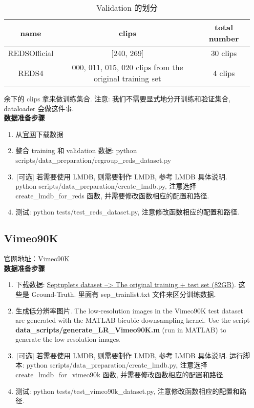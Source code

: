 \documentclass[../main.tex]{subfiles}
\begin{document}
\begin{table}[htbp]
    \centering
    \begin{tabular}{|c|c|c|}
        \hline
        \textbf{name} & \textbf{clips}                                          & \textbf{total number} \\ \hline
        REDSOfficial  & [240, 269]                                              & 30 clips              \\ \hline
        REDS4         & 000, 011, 015, 020 clips from the original training set & 4 clips               \\ \hline
    \end{tabular}
    \caption{Validation 的划分}
\end{table}
余下的 clips 拿来做训练集合. 注意: 我们不需要显式地分开训练和验证集合, dataloader 会做这件事.\\

\noindent\textbf{数据准备步骤}

\begin{enumerate}
    \item 从\href{https://seungjunnah.github.io/Datasets/reds.html}{官网}下载数据
    \item 整合 training 和 validation 数据: python scripts/data\_preparation/regroup\_reds\_dataset.py
    \item\,[可选] 若需要使用 LMDB, 则需要制作 LMDB, 参考 LMDB 具体说明. python scripts/data\_preparation/create\_lmdb.py, 注意选择 create\_lmdb\_for\_reds 函数, 并需要修改函数相应的配置和路径.
    \item 测试: python tests/test\_reds\_dataset.py, 注意修改函数相应的配置和路径.
\end{enumerate}

\subsection{Vimeo90K}

官网地址：\href{http://toflow.csail.mit.edu/}{Vimeo90K}\\

\noindent\textbf{数据准备步骤}
\begin{enumerate}
    \item 下载数据: \href{http://data.csail.mit.edu/tofu/dataset/vimeo_septuplet.zip}{Septuplets dataset --> The original training + test set (82GB)}. 这些是 Ground-Truth. 里面有 sep\_trainlist.txt 文件来区分训练数据.
    \item 生成低分辨率图片. The low-resolution images in the Vimeo90K test dataset are generated with the MATLAB bicubic downsampling kernel. Use the script \textbf{data\_scripts/generate\_LR\_Vimeo90K.m} (run in MATLAB) to generate the low-resolution images.
    \item\,[可选] 若需要使用 LMDB, 则需要制作 LMDB, 参考 LMDB 具体说明. 运行脚本: python scripts/data\_preparation/create\_lmdb.py, 注意选择 create\_lmdb\_for\_vimeo90k 函数, 并需要修改函数相应的配置和路径.
    \item 测试: python tests/test\_vimeo90k\_dataset.py, 注意修改函数相应的配置和路径.
\end{enumerate}
\end{document}

